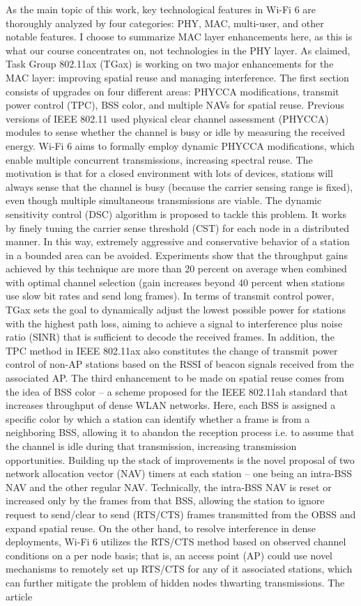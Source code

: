 \documentclass[12pt, a4paper, onside]{article}
\begin{document}
As the main topic of this work, key technological features in Wi-Fi 6 are thoroughly analyzed by four categories: PHY, MAC, multi-user, and other notable features. I choose to summarize MAC layer enhancements here, as this is what our course concentrates on, not technologies in the PHY layer. As claimed, Task Group 802.11ax (TGax) is working on two major enhancements for the MAC layer: improving spatial reuse and managing interference. The first section consists of upgrades on four different areas: PHYCCA modifications, transmit power control (TPC), BSS color, and multiple NAVs for spatial reuse. Previous versions of IEEE 802.11 used physical clear channel assessment (PHYCCA) modules to sense whether the channel is busy or idle by measuring the received energy. Wi-Fi 6 aims to formally employ dynamic PHYCCA modifications, which enable multiple concurrent transmissions, increasing spectral reuse. The motivation is that for a closed environment with lots of devices, stations will always sense that the channel is busy (because the carrier sensing range is fixed), even though multiple simultaneous transmissions are viable. The dynamic sensitivity control (DSC) algorithm is proposed to tackle this problem. It works by finely tuning the carrier sense threshold (CST) for each node in a distributed manner. In this way, extremely aggressive and conservative behavior of a station in a bounded area can be avoided. Experiments show that the throughput gains achieved by this technique are more than 20 percent on average when combined with optimal channel selection (gain increases beyond 40 percent when stations use slow bit rates and send long frames). In terms of transmit control power, TGax sets the goal to dynamically adjust the lowest possible power for stations with the highest path loss, aiming to achieve a signal to interference plus noise ratio (SINR) that is sufficient to decode the received frames. In addition, the TPC method in IEEE 802.11ax also constitutes the change of transmit power control of non-AP stations based on the RSSI of beacon signals received from the associated AP. The third enhancement to be made on spatial reuse comes from the idea of BSS color -- a scheme proposed for the IEEE 802.11ah standard that increases throughput of dense WLAN networks. Here, each BSS is assigned a specific color by which a station can identify whether a frame is from a neighboring BSS, allowing it to abandon the reception process i.e. to assume that the channel is idle during that transmission, increasing transmission opportunities. Building up the stack of improvements is the novel proposal of two network allocation vector (NAV) timers at each station -- one being an intra-BSS NAV and the other regular NAV. Technically, the intra-BSS NAV is reset or increased only by the frames from that BSS, allowing the station to ignore request to send/clear to send (RTS/CTS) frames transmitted from the OBSS and expand spatial reuse. On the other hand, to resolve interference in dense deployments, Wi-Fi 6 utilizes the RTS/CTS method based on observed channel conditions on a per node basis; that is, an access point (AP) could use novel mechanisms to remotely set up RTS/CTS for any of it associated stations, which can further mitigate the problem of hidden nodes thwarting transmissions. The article 
\end{document}
